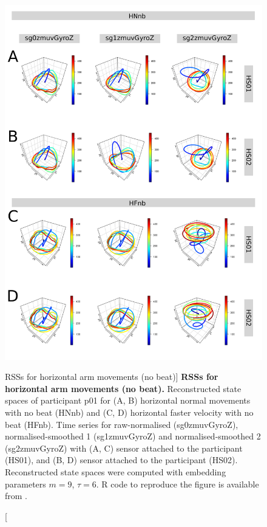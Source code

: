 \begin{figure}
\centering
\includegraphics[height=0.8\textheight]{rss_Hnb_w500}
\caption
	[RSSs for horizontal arm movements (no beat)]{
	{\bf RSSs for horizontal arm movements (no beat).}
	Reconstructed state spaces of participant p01 for 
	(A, B) horizontal normal movements with no beat (HNnb) and 
	(C, D) horizontal faster velocity with no beat (HFnb).
	Time series for raw-normalised (sg0zmuvGyroZ), 
	normalised-smoothed 1 (sg1zmuvGyroZ) and 
	normalised-smoothed 2 (sg2zmuvGyroZ) with
	(A, C) sensor attached to the participant (HS01), and
	(B, D) sensor attached to the participant (HS02).	
	Reconstructed state spaces were computed with 
	embedding parameters $m=9$, $\tau=6$.
	R code to reproduce the figure is available from \cite{hwum2018}.
        }
     \label{fig:rss_Hnb_w500}
\end{figure}



